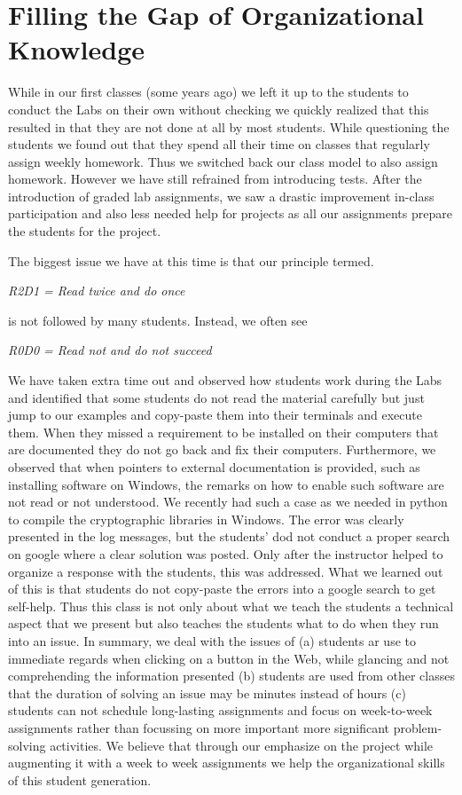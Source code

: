 \documentclass[conference]{IEEEtran}
\begin{document}
\section{Filling the Gap of Organizational Knowledge}

While in our first classes (some years ago) we left it up to the
students to conduct the Labs on their own without checking we quickly
realized that this resulted in that they are not done at all by most
students. While questioning the students we found out that they spend
all their time on classes that regularly assign weekly homework. Thus
we switched back our class model to also assign homework. However we
have still refrained from introducing tests. After the introduction of
graded lab assignments, we saw a drastic improvement in-class
participation and also less needed help for projects as all our
assignments prepare the students for the project.

The biggest issue we have at this time is that our principle termed.

{\em R2D1 = Read twice and do once}

is not followed by many students. Instead, we often see

{\em R0D0 = Read not and do not succeed}


We have taken extra time out and
observed how students work during the Labs and identified that some
students do not read the material carefully but just jump to our
examples and copy-paste them into their terminals and execute
them. When they missed a requirement to be installed on their
computers that are documented they do not go back and fix their
computers.
Furthermore, we observed that when pointers to external
documentation is provided, such as installing software on Windows, the
remarks on how to enable such software are not read or not understood.
We recently had such a  case as we needed in python to compile the
cryptographic libraries in Windows. The error was clearly presented in the log
messages, but the students' dod not conduct a proper search on google
where a clear solution was posted. Only after the instructor helped
to organize a response with the students, this was addressed. What we
learned out of this is that students do not copy-paste the errors into
a google search to get self-help. Thus this class is not only about
what we teach the students a technical aspect that we present but
also teaches the students what to do when they run into an issue.
In summary, we deal with the issues of
(a) students ar use to immediate regards when clicking on a button in
the Web, while glancing and not comprehending the information
presented 
(b) students are used from other classes that the duration of solving
an issue may be minutes instead of hours
(c) students can not schedule long-lasting assignments and focus
on week-to-week assignments rather than focussing on more important
more significant problem-solving activities.
We believe that through our emphasize on the project while augmenting
it with a week to week assignments we help the organizational skills of
this student generation.
\end{document}
